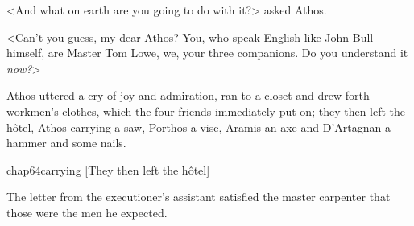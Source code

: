 <And what on earth are you going to do with it?> asked Athos.

<Can't you guess, my dear Athos? You, who speak English like John Bull himself, are Master Tom Lowe, we, your three companions. Do you understand it \emph{now?}>

Athos uttered a cry of joy and admiration, ran to a closet and drew forth workmen's clothes, which the four friends immediately put on; they then left the hôtel, Athos carrying a saw, Porthos a vise, Aramis an axe and D'Artagnan a hammer and some nails.

\begin{bwbigpic}
	[\basicscale] 
	{chap64carrying}
	[They then left the hôtel]
\end{bwbigpic}

The letter from the executioner's assistant satisfied the master carpenter that those were the men he expected. 